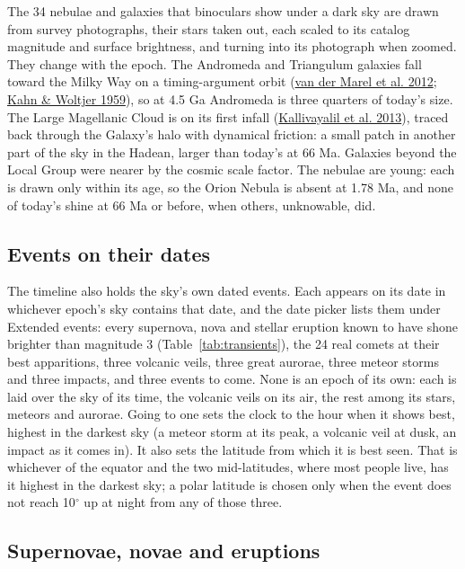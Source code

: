 \documentclass[9pt,twocolumn]{extarticle}
\begin{document}
The 34 nebulae and galaxies that binoculars show under a dark sky are drawn from survey photographs, their stars taken out, each scaled to its catalog magnitude and surface brightness, and turning into its photograph when zoomed. They change with the epoch. The Andromeda and Triangulum galaxies fall toward the Milky Way on a timing-argument orbit (\protect\hyperlink{cite.vandermarel2012}{van der Marel et al. 2012}; \protect\hyperlink{cite.kahn1959}{Kahn \& Woltjer 1959}), so at 4.5 Ga Andromeda is three quarters of today's size. The Large Magellanic Cloud is on its first infall (\protect\hyperlink{cite.kallivayalil2013}{Kallivayalil et al. 2013}), traced back through the Galaxy's halo with dynamical friction: a small patch in another part of the sky in the Hadean, larger than today's at 66 Ma. Galaxies beyond the Local Group were nearer by the cosmic scale factor. The nebulae are young: each is drawn only within its age, so the Orion Nebula is absent at 1.78 Ma, and none of today's shine at 66 Ma or before, when others, unknowable, did.


\subsection{Events on their dates}\label{events}

The timeline also holds the sky's own dated events. Each appears on its date in whichever epoch's sky contains that date, and the date picker lists them under Extended events: every supernova, nova and stellar eruption known to have shone brighter than magnitude 3 (Table~\ref{tab:transients}), the 24 real comets at their best apparitions, three volcanic veils, three great aurorae, three meteor storms and three impacts, and three events to come. None is an epoch of its own: each is laid over the sky of its time, the volcanic veils on its air, the rest among its stars, meteors and aurorae. Going to one sets the clock to the hour when it shows best, highest in the darkest sky (a meteor storm at its peak, a volcanic veil at dusk, an impact as it comes in). It also sets the latitude from which it is best seen. That is whichever of the equator and the two mid-latitudes, where most people live, has it highest in the darkest sky; a polar latitude is chosen only when the event does not reach 10$^\circ$ up at night from any of those three.


\subsection{Supernovae, novae and eruptions}\label{supernovae}
\end{document}

